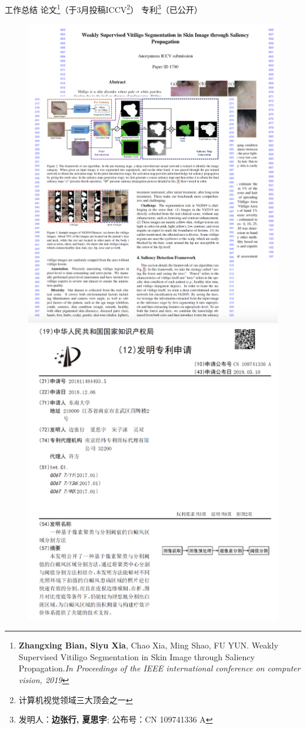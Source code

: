 \begin{frame}{工作总结}
论文\footnote{\tiny \textbf{Zhangxing Bian, Siyu Xia}, Chao Xia, Ming Shao, FU YUN. Weakly Supervised Vitiligo
Segmentation in Skin Image through Saliency Propagation.\textit{In Proceedings of the IEEE
international conference on computer vision, 2019}}（于3月投稿ICCV\footnote{\tiny 计算机视觉领域三大顶会之一}）
\hspace{2.5cm}专利\footnote{\tiny 发明人：\textbf{边张行, 夏思宇}; 公布号：CN 109741336 A}（已公开）
\begin{figure}
    \includegraphics[width=.4\linewidth]{figures/paperFigure.png}
    \hfill
    \includegraphics[width=.4\linewidth]{figures/patent.png}
\end{figure}
\end{frame}
